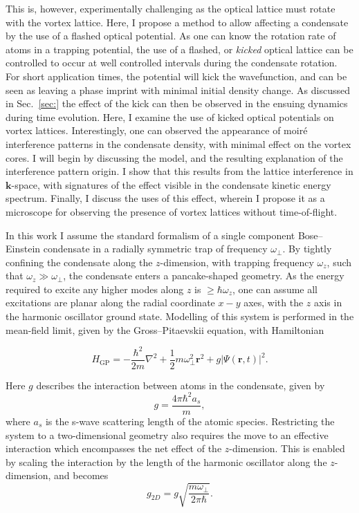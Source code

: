 This is, however, experimentally challenging as the optical lattice must rotate with the vortex lattice. Here, I propose a method to allow affecting a condensate by the use of a flashed optical potential. As one can know the rotation rate of atoms in a trapping potential, the use of a flashed, or \textit{kicked} optical lattice can be controlled to occur at well controlled intervals during the condensate rotation. For short application times, the potential will kick the wavefunction, and can be seen as leaving a phase imprint with minimal initial density change. As discussed in Sec.~\ref{sec:} the effect of the kick can then be observed in the ensuing dynamics during time evolution. Here, I examine the use of kicked optical potentials on vortex lattices. Interestingly, one can observed the appearance of moir\'e interference patterns in the condensate density, with minimal effect on the vortex cores. I will begin by discussing the model, and the resulting explanation of the interference pattern origin. I show that this results from the lattice interference in $\mathbf{k}$-space, with signatures of the effect visible in the condensate kinetic energy spectrum. Finally, I discuss the uses of this effect, wherein I propose it as a microscope for observing the presence of vortex lattices without time-of-flight.

\iffalse
In this work I assume the standard formalism of a single component Bose--Einstein condensate in a radially symmetric trap of frequency $\omega_\perp$. By tightly confining the condensate along the $z$-dimension, with trapping frequency $\omega_z$, such that $\omega_z \gg \omega_\perp$, the condensate enters a pancake-shaped geometry. As the energy required to excite any higher modes along $z$ is $\geq \hbar\omega_z$, one can assume all excitations are planar along the radial coordinate $x-y$ axes, with the $z$ axis in the harmonic oscillator ground state. Modelling of this system is performed in the mean-field limit, given by the Gross--Pitaevskii equation, with Hamiltonian

\begin{equation}\label{eqn:gpe_h0}
	H_{\mathrm{GP}} = -\frac{\hbar^2}{2m}\nabla^2 + \frac{1}{2}m\omega_{\perp}^2\mathbf{r}^2 + g\vert\Psi(\mathbf{r},t)\vert^2.
\end{equation}

Here $g$ describes the interaction between atoms in the condensate, given by \begin{equation}
g = \frac{4\pi\hbar^2a_s}{m},
\end{equation}
where $a_s$ is the s-wave scattering length of the atomic species. Restricting the system to a two-dimensional geometry also requires the move to an effective interaction which encompasses the net effect of the $z$-dimension. This is enabled by scaling the interaction by the length of the harmonic oscillator along the $z$-dimension, and becomes \cite[pg. 456]{BK:Pethick_smith_}
\begin{equation}
g_{2D} = g\sqrt{\frac{m\omega_\perp}{2\pi\hbar}}.
\end{equation}

